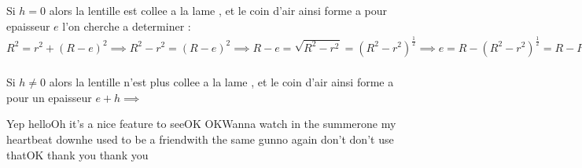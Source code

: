 \documentclass[12pt]{book}
\begin{document}
            Si $h=0$ alors la lentille est collee a la lame , et le coin d'air ainsi forme a pour epaisseur $e$ l'on cherche a determiner :\\
            $R^2= r^2+(R-e)^2 \implies R^2 - r^2 = (R-e)^2 \implies R-e = \sqrt{R^2-r^2} = (R^2-r^2)^{\frac{1}{2}}\implies e = R-(R^2-r^2)^{\frac{1}{2}} = R-R(1-\frac{r^2}{R^2})^{\frac{1}{2}}\approx R-R(1-\frac{1}{2}\frac{r^2}{R^2}) = \frac{1}{2}\frac{r^2}{R}$\\
             \\
            Si $h \not = 0$ alors la lentille n'est plus collee a la lame , et le coin d'air ainsi forme a pour un epaisseur $e+h \implies $ 


            Yep helloOh it's a nice feature to seeOK OKWanna watch in the summerone my heartbeat downhe used to be a friendwith the same gunno again don't don't use thatOK thank you thank you
\end{document}
